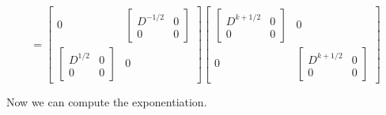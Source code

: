 \begin{dmath}
=
\begin{bmatrix} %
0 &
\begin{bmatrix}
D^{-1/2} & 0 \\
0 & 0
\end{bmatrix} \\
\begin{bmatrix}
D^{1/2} & 0 \\
0 & 0
\end{bmatrix} &
0
\end{bmatrix} %
\begin{bmatrix}
\begin{bmatrix}
D^{k+1/2} & 0 \\
0 & 0
\end{bmatrix}
& 0 \\
0 &
\begin{bmatrix}
D^{k + 1/2} & 0 \\
0 & 0
\end{bmatrix}
\end{bmatrix}
\end{dmath}

Now we can compute the exponentiation.

